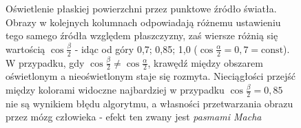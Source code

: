 \begin{figure}[H]

\caption[Oświetlenie płaskiej powierzchni przez punktowe źródło światła]{Oświetlenie płaskiej powierzchni przez punktowe źródło światła. Obrazy w kolejnych kolumnach odpowiadają różnemu ustawieniu tego samego źródła względem płaszczyzny, zaś wiersze różnią się wartością $\cos\frac{\beta}{2}$ - idąc od góry 0,7; 0,85; 1,0 ($\cos\frac{\alpha}{2} = 0,7 = \mathrm{const}$). W przypadku, gdy $\cos\frac{\beta}{2}\neq\cos\frac{\alpha}{2}$, krawędź między obszarem oświetlonym a nieoświetlonym staje się rozmyta. Nieciągłości przejść między kolorami widoczne najbardziej w przypadku $\cos\frac{\beta}{2} = 0,85$ nie są wynikiem błędu algorytmu, a własności przetwarzania obrazu przez mózg człowieka - efekt ten zwany jest \textit{pasmami Macha}~\cite{MACH_BANDS}}
\label{ch3:img:light_comp}
\end{figure}